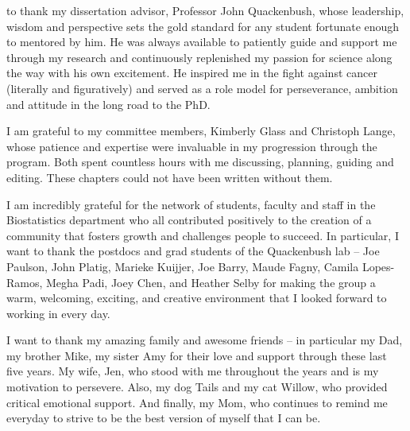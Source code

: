 
 to thank my dissertation advisor, Professor John Quackenbush, whose leadership, wisdom and perspective sets the gold standard for any student fortunate enough to mentored by him. He was always available to patiently guide and support me through my research and continuously replenished my passion for science along the way with his own excitement.  He inspired me in the fight against cancer (literally and figuratively) and served as a role model for perseverance, ambition and attitude in the long road to the PhD.  

I am grateful to my committee members, Kimberly Glass and Christoph Lange, whose patience and expertise were invaluable in my progression through the program.  Both spent countless hours with me discussing, planning, guiding and editing. These chapters could not have been written without them.

I am incredibly grateful for the network of students, faculty and staff in the Biostatistics department who all contributed positively to the creation of a community that fosters growth and challenges people to succeed. In particular, I want to thank the postdocs and grad students of the Quackenbush lab – Joe Paulson, John Platig, Marieke Kuijjer, Joe Barry, Maude Fagny, Camila Lopes-Ramos, Megha Padi, Joey Chen, and Heather Selby for making the group a warm, welcoming, exciting, and creative environment that I looked forward to working in every day.

I want to thank my amazing family and awesome friends – in particular my Dad, my brother Mike, my sister Amy for their love and support through these last five years.  My wife, Jen, who stood with me throughout the years and is my motivation to persevere. Also, my dog Tails and my cat Willow, who provided critical emotional support.  And finally, my Mom, who continues to remind me everyday to strive to be the best version of myself that I can be.